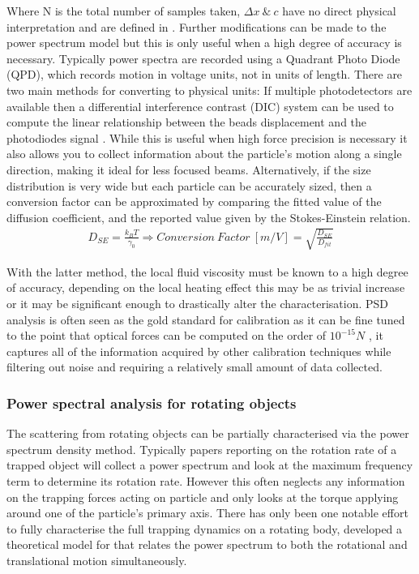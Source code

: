 Where N is the total number of samples taken, $\Delta x \ \& \ c$ 
have no direct physical interpretation and are defined in 
\cite{BergSoerensen2004}. Further modifications can be made to the 
power spectrum model but this is only useful when a high degree of 
accuracy is necessary. Typically power spectra are recorded using 
a Quadrant Photo Diode (QPD), which records motion in voltage units, 
not in units of length. There are two main methods for converting to
physical units: If multiple photodetectors are available then a 
differential interference contrast (DIC) system can be used to compute
the linear relationship between the beads displacement and the photodiodes
signal \cite{Capitanio2002}. While this is useful when high force precision 
is necessary it also allows you to collect information about the particle's 
motion along a single direction, making it ideal for less focused beams. 
Alternatively, if the size distribution is very wide but each particle can be 
accurately sized, then a conversion factor can be approximated by comparing 
the fitted value of the diffusion coefficient, and the reported value 
given by the Stokes-Einstein relation.
\begin{align}
	\label{eq:conversion_factor}
	D_{SE} = \frac{k_BT}{\gamma_0} \Rightarrow Conversion\ Factor \ [m/V]= \sqrt{\frac{D_{SE}}{D_{fit}}}
\end{align}

With the latter method, the local fluid viscosity must be known to a 
high degree of accuracy, depending on the local heating effect this 
may be as trivial increase or it may be significant enough to drastically 
alter the characterisation. PSD analysis is often seen as the gold 
standard for calibration as it can be fine tuned to the point that 
optical forces can be computed on the order of $10^{-15} N$ 
\cite{BergSoerensen2004}, it captures all of the information acquired 
by other calibration techniques while filtering out noise and requiring 
a relatively small amount of data collected. 

\subsubsection{Power spectral analysis for rotating objects}
The scattering from rotating objects can be partially characterised via
the power spectrum density method. Typically papers reporting on the 
rotation rate of a trapped object will collect a power spectrum and look
at the maximum frequency term to determine its rotation rate. However this
often neglects any information on the trapping forces acting on particle
and only looks at the torque applying around one of the particle's primary 
axis. There has only been one notable effort to fully characterise the 
full trapping dynamics on a rotating body, \cite{Yogesha2012} developed 
a theoretical model for that relates the power spectrum to both the 
rotational and translational motion simultaneously. 

